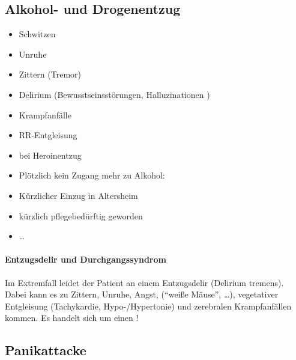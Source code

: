 \subsection{Alkohol- und Drogenentzug}
\label{topic:alkohol-entzug}



{%
\begin{itemize}
  \item Schwitzen
  \item Unruhe
  \item Zittern (Tremor)
  \item Delirium  (Bewusstseinsstörungen, Halluzinationen )
  \item Krampfanfälle
  \item RR-Entgleisung
  \item {} bei Heroinentzug
\end{itemize}
}{

}{}{}{}

{
\begin{itemize}
  \item Plötzlich kein Zugang mehr zu Alkohol:
  \item Kürzlicher Einzug in Altersheim
  \item kürzlich pflegebedürftig geworden
  \item \ldots
\end{itemize}
}{}{}{}{}












\label{topic:alkoholentzugsdelir}
\label{topic:durchgangssyndrom}
\paragraph{Entzugsdelir und Durchgangssyndrom} Im Extremfall
leidet der Patient an einem Entzugsdelir (Delirium tremens). Dabei kann  es zu
Zittern, Unruhe, Angst,  (\enquote{weiße
Mäuse}, \ldots), vegetativer Entgleisung (Tachykardie,
Hypo-/Hypertonie) und zerebralen Krampfanfällen kommen. Es
handelt sich um einen !



\subsection{Panikattacke}


